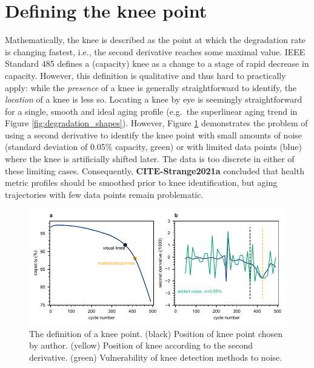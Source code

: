 \documentclass{article}
\newcommand{\cmark}{\textcolor{blue}{\textrm{\ding{52}}}}%
\newcommand{\pbox}[1]{{
\fbox{
\parbox{0.8\textwidth}{  \fbox{$\triangleright$\textcolor{blue}{\textbf{From Peter}:}} 
#1
}}}}
\begin{document}
\newpage
\section{Defining the knee point}


Mathematically, the knee is described as the point at which the degradation rate is changing fastest, i.e., the second derivative reaches some maximal value. IEEE Standard 485  \cite{noauthor_ieee_2011} defines a (capacity) knee as a change to a stage of rapid decrease in capacity. However, this definition is qualitative and thus hard to practically apply: while the \textit{presence} of a knee is generally straightforward to identify, the \textit{location} of a knee is less so. 
Locating a knee by eye is seemingly straightforward for a single, smooth and ideal aging profile (e.g.~the superlinear aging trend in Figure \ref{fig:degradation_shapes}). However, Figure \ref{fig:knee_definition3} demonstrates the problem of using a second derivative to identify the knee point with small amounts of noise (standard deviation of 0.05\% capacity, green) or with limited data points (blue) where the knee is artificially shifted later. The data is too discrete in either of these limiting cases.
Consequently, \textbf{CITE-Strange2021a} concluded that health metric profiles should be smoothed prior to knee identification, but aging trajectories with few data points remain problematic.

\begin{figure}[ht]
\centering
\includegraphics[width=.8\textwidth]{images/knee_definition.pdf}
\caption{The definition of a knee point. (black) Position of knee point chosen by author. (yellow) Position of knee according to the second derivative. (green) Vulnerability of knee detection methods to noise.}
\label{fig:knee_definition3}
\end{figure}
\end{document}
